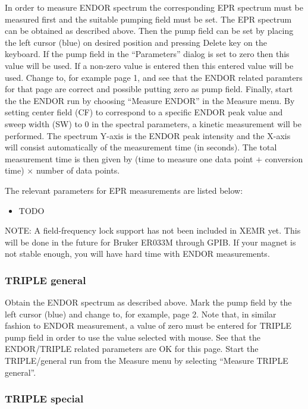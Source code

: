 \documentclass[byrevtex,amssymb,aps,pra,floatfix,letterpaper]{revtex4}
\begin{document}
In order to measure ENDOR spectrum the corresponding EPR spectrum must be measured first and the suitable pumping field must be set. The EPR spectrum can be obtained as described above. Then the pump field can be set by placing the left cursor (blue) on desired position and pressing Delete key on the keyboard. If the pump field in the ``Parameters'' dialog is set to zero then this value will be used. If a non-zero value is entered then this entered value will be used. Change to, for example page 1, and see that the ENDOR related paramters for that page are correct and possible putting zero as pump field. Finally, start the the ENDOR run by choosing ``Measure ENDOR'' in the Measure menu. By setting center field (CF) to correspond to a specific ENDOR peak value and sweep width (SW) to 0 in the spectral parameters, a kinetic measurement will be performed. The spectrum Y-axis is the ENDOR peak intensity and the X-axis will consist automatically of the measurement time (in seconds). The total measurement time is then given by (time to measure one data
point $+$ conversion time) $\times$ number of data points.

The relevant parameters for EPR measurements are listed below:

\begin{itemize}
\item TODO
\end{itemize}

\noindent
NOTE: A field-frequency lock support has not been included in XEMR yet. This will be done in the future for Bruker ER033M through GPIB. If your magnet is not stable enough, you will have hard time with ENDOR measurements.

\subsubsection{TRIPLE general}

Obtain the ENDOR spectrum as described above. Mark the pump field by the left cursor (blue) and change to, for example, page 2. Note that, in similar fashion to ENDOR measurement, a value of zero must be entered for TRIPLE pump field in order to use the value selected with mouse. See that the ENDOR/TRIPLE related parameters are OK for this page. Start the TRIPLE/general run from the Measure menu by selecting ``Measure TRIPLE general''.

\subsubsection{TRIPLE special}
\end{document}
